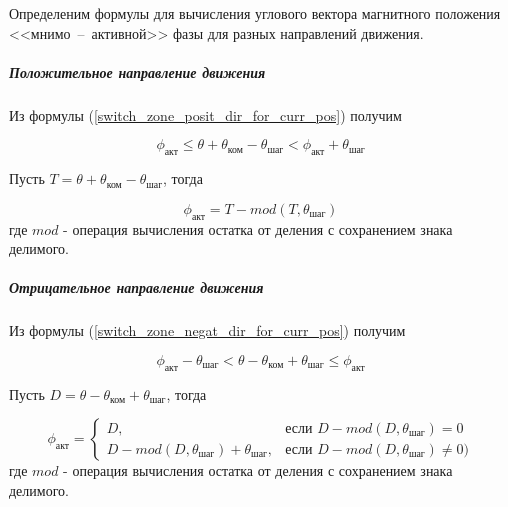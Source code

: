Определеним формулы для вычисления углового вектора магнитного положения
<<мнимо~--~активной>> фазы для разных направлений движения.

\subparagraph{Положительное направление движения}

Из формулы (\ref{switch_zone_posit_dir_for_curr_pos}) получим

\begin{equation}
    \label{sync_restore_posit_dir_active_pole_pos_conditions}
    \phi_\textit{акт}
    \leq \theta + \theta_\textit{ком} - \theta_\textit{шаг}
    < \phi_\textit{акт} + \theta_\textit{шаг}
\end{equation}

Пусть $T = \theta + \theta_\textit{ком} - \theta_\textit{шаг}$, тогда

\begin{equation}
    \label{sync_restore_posit_dir_active_pole_pos}
    \phi_\textit{акт} = T - mod(T, \theta_\textit{шаг})
\end{equation}
где $mod$ - операция вычисления остатка от деления с сохранением знака делимого.

\subparagraph{Отрицательное направление движения}
Из формулы (\ref{switch_zone_negat_dir_for_curr_pos}) получим

\begin{equation}
    \label{sync_restore_negat_dir_active_pole_pos_conditions}
    \phi_\textit{акт} - \theta_\textit{шаг}
    < \theta - \theta_\textit{ком} + \theta_\textit{шаг}
    \leq \phi_\textit{акт}
\end{equation}

Пусть $D = \theta - \theta_\textit{ком} + \theta_\textit{шаг}$, тогда

\begin{equation}
    \label{sync_restore_negat_dir_active_pole_pos}
    \phi_\textit{акт} =
        \begin{cases}
            D,                                                      & \mbox{если } D - mod(D, \theta_\textit{шаг}) = 0 \\
            D - mod(D, \theta_\textit{шаг}) + \theta_\textit{шаг},  & \mbox{если } D - mod(D, \theta_\textit{шаг}) \ne 0)
        \end{cases}
\end{equation}
где $mod$ - операция вычисления остатка от деления с сохранением знака делимого.

